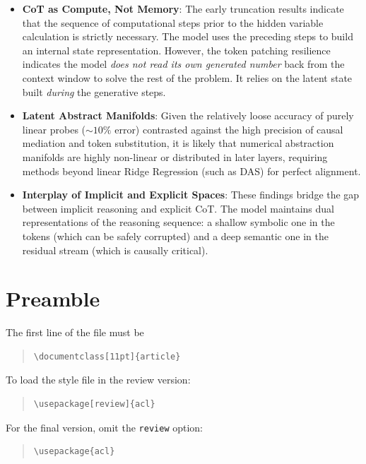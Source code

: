 \documentclass[11pt]{article}
\begin{document}
\begin{itemize}
    \item \textbf{CoT as Compute, Not Memory}: The early truncation results indicate that the sequence of computational steps prior to the hidden variable calculation is strictly necessary. The model uses the preceding steps to build an internal state representation. However, the token patching resilience indicates the model \textit{does not read its own generated number} back from the context window to solve the rest of the problem. It relies on the latent state built \textit{during} the generative steps.
    \item \textbf{Latent Abstract Manifolds}: Given the relatively loose accuracy of purely linear probes ($\sim10\%$ error) contrasted against the high precision of causal mediation and token substitution, it is likely that numerical abstraction manifolds are highly non-linear or distributed in later layers, requiring methods beyond linear Ridge Regression (such as DAS) for perfect alignment.
    \item \textbf{Interplay of Implicit and Explicit Spaces}: These findings bridge the gap between implicit reasoning and explicit CoT. The model maintains dual representations of the reasoning sequence: a shallow symbolic one in the tokens (which can be safely corrupted) and a deep semantic one in the residual stream (which is causally critical).
\end{itemize}

\section{Preamble}

The first line of the file must be
\begin{quote}
\begin{verbatim}
\documentclass[11pt]{article}
\end{verbatim}
\end{quote}

To load the style file in the review version:
\begin{quote}
\begin{verbatim}
\usepackage[review]{acl}
\end{verbatim}
\end{quote}
For the final version, omit the \verb|review| option:
\begin{quote}
\begin{verbatim}
\usepackage{acl}
\end{verbatim}
\end{quote}
\end{document}
